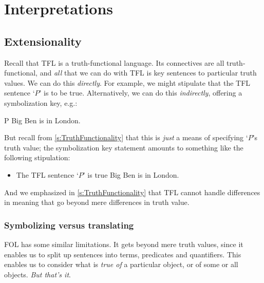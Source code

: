 \part{Interpretations}
\label{ch.semantics}


\chapter{Extensionality}\label{s:Interpretations}

Recall that TFL is a truth-functional language. Its connectives are all truth-functional, and \emph{all} that we can do with TFL is key sentences to particular truth values. We can do this \emph{directly}. For example, we might stipulate that the TFL sentence `$P$' is to be true. Alternatively, we can do this \emph{indirectly}, offering a symbolization key, e.g.:
	\begin{ekey}
		\item[P] Big Ben is in London.
	\end{ekey}
 But recall from \cref{s:TruthFunctionality} that this is \emph{just} a means of specifying `$P$'s truth value; the symbolization key statement amounts to something like the following stipulation: 
	\begin{itemize}
		\item The TFL sentence `$P$' is true \ifeff{} Big Ben is in London.
	\end{itemize}
And we emphasized in \cref{s:TruthFunctionality} that TFL cannot handle differences in meaning that go beyond mere differences in truth value.

\section{Symbolizing versus translating}

FOL has some similar limitations. It gets beyond mere truth values,
since it enables us to split up sentences into terms, predicates and
quantifiers. This enables us to consider what is \emph{true of} a
particular object, or of some or all objects. \emph{But that's it}.

